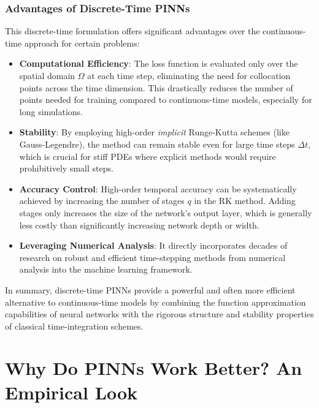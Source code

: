 \subsubsection{Advantages of Discrete-Time PINNs}

This discrete-time formulation offers significant advantages over the continuous-time approach for certain problems:

\begin{itemize}
    \item \textbf{Computational Efficiency}: The loss function is evaluated only over the spatial domain $\Omega$ at each time step, eliminating the need for collocation points across the time dimension. This drastically reduces the number of points needed for training compared to continuous-time models, especially for long simulations.
    \item \textbf{Stability}: By employing high-order \textit{implicit} Runge-Kutta schemes (like Gauss-Legendre), the method can remain stable even for large time steps $\Delta t$, which is crucial for stiff PDEs where explicit methods would require prohibitively small steps.
    \item \textbf{Accuracy Control}: High-order temporal accuracy can be systematically achieved by increasing the number of stages $q$ in the RK method. Adding stages only increases the size of the network's output layer, which is generally less costly than significantly increasing network depth or width.
    \item \textbf{Leveraging Numerical Analysis}: It directly incorporates decades of research on robust and efficient time-stepping methods from numerical analysis into the machine learning framework.
\end{itemize}

In summary, discrete-time PINNs provide a powerful and often more efficient alternative to continuous-time models by combining the function approximation capabilities of neural networks with the rigorous structure and stability properties of classical time-integration schemes.


\section{Why Do PINNs Work Better? An Empirical Look}
\label{sec:empirical_evaluation_pinns}

